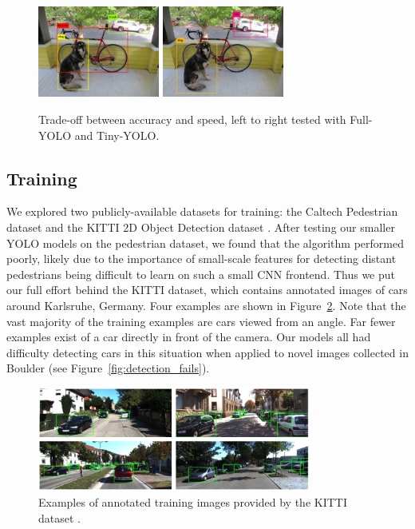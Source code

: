 \documentclass{article}
\begin{document}
\begin{figure}[t]
  \centering
  \includegraphics[height=3cm]{yolov2} 
  \includegraphics[height=3cm]{yolov2-tiny}
  \caption{Trade-off between accuracy and speed, left to right tested with Full-YOLO and Tiny-YOLO.}
  \label{fig:trade-off}
\end{figure}

\subsection{Training}
\label{subsec:training}

We explored two publicly-available datasets for training: the Caltech Pedestrian dataset \cite{caltech_peds} and the KITTI 2D Object Detection dataset \cite{kitti}. After testing our smaller YOLO models on the pedestrian dataset, we found that the algorithm performed poorly, likely due to the importance of small-scale features for detecting distant pedestrians being difficult to learn on such a small CNN frontend. Thus we put our full effort behind the KITTI dataset, which contains annotated images of cars around Karlsruhe, Germany. Four examples are shown in Figure~\ref{fig:kitti_examples}. Note that the vast majority of the training examples are cars viewed from an angle. Far fewer examples exist of a car directly in front of the camera. Our models all had difficulty detecting cars in this situation when applied to novel images collected in Boulder (see Figure~\ref{fig:detection_fails}).

\begin{figure}[p]
  \centering
  \includegraphics[width=0.8\textwidth]{kitti_examples}
  \caption{Examples of annotated training images provided by the KITTI dataset \cite{kitti}.}
  \label{fig:kitti_examples}
\end{figure}
\end{document}
